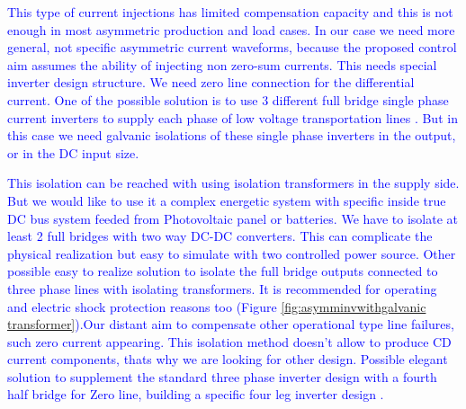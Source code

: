    \textcolor{blue}{
        This type of current injections has limited compensation capacity and this is not enough in  most asymmetric production and load cases. In our case we need more general, not specific asymmetric current waveforms, because the proposed control aim assumes the ability of injecting non zero-sum currents. This needs special inverter design structure. We need zero line connection for the differential current. One of the possible solution is to use 3 different full bridge single phase current inverters to supply each phase of low voltage transportation lines \cite{Patnaik2013topologies}. But in this case we need galvanic isolations of these single phase inverters in the output, or in the DC input size.}

    \textcolor{blue}{
        This isolation can be reached  with using isolation transformers in the supply side. But we would like to use it a complex energetic system with specific inside true DC bus system feeded from Photovoltaic panel or batteries. We have to isolate  at least 2 full bridges with two way DC-DC converters. This can complicate the physical realization but easy to simulate with two controlled power source. Other possible easy to realize solution to isolate the full bridge outputs  connected to three phase lines with isolating transformers. It is recommended for operating and electric shock protection reasons too (Figure \ref{fig:asymminvwithgalvanic transformer}).Our distant aim to compensate other operational type line failures, such zero current appearing. This isolation method doesn't allow to produce CD current components, thats why we are looking for other design. Possible elegant solution to supplement the standard three phase inverter design with a fourth half bridge for Zero line, building a specific four leg inverter design \cite{Ninad2014control}.}

